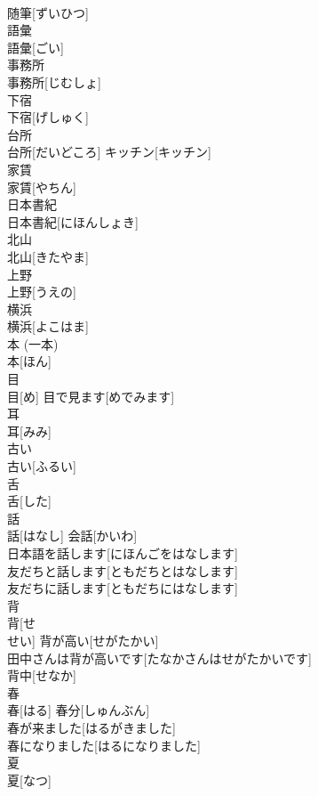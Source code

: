 \documentclass[8pt]{extreport}
\begin{document}
\begin{CJK}{UTF8}{min}
\\	随筆[ずいひつ]	
\\	語彙	
\\	語彙[ごい]	
\\	事務所	
\\	事務所[じむしょ]	
\\	下宿	
\\	下宿[げしゅく]	
\\	台所	
\\	台所[だいどころ]	キッチン[キッチン] 
\\	家賃	
\\	家賃[やちん]	
\\	日本書紀	
\\	日本書紀[にほんしょき]	
\\	北山	
\\	北山[きたやま]	
\\	上野	
\\	上野[うえの]	
\\	横浜	
\\	横浜[よこはま]	
\\	本 (一本)	
\\	本[ほん]	
\\	目	
\\	目[め]	目で見ます[めでみます] 
\\	耳	
\\	耳[みみ]	
\\	古い	
\\	古い[ふるい]	
\\	舌	
\\	舌[した]	
\\	話	
\\	話[はなし]	会話[かいわ] 
\\	日本語を話します[にほんごをはなします] 
\\	友だちと話します[ともだちとはなします] 
\\	友だちに話します[ともだちにはなします] 
\\	背	
\\	背[せ 
\\	せい]	背が高い[せがたかい] 
\\	田中さんは背が高いです[たなかさんはせがたかいです] 
\\	背中[せなか] 
\\	春	
\\	春[はる]	春分[しゅんぶん] 
\\	春が来ました[はるがきました] 
\\	春になりました[はるになりました] 
\\	夏	
\\	夏[なつ]	

\end{CJK}
\end{document}
